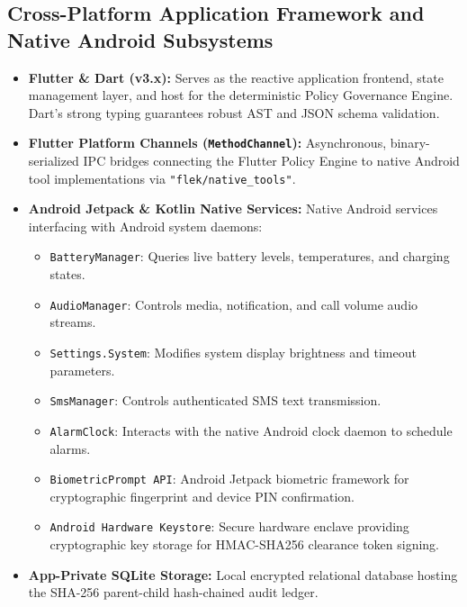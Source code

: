 \subsection{Cross-Platform Application Framework and Native Android Subsystems}
\begin{itemize}
    \item \textbf{Flutter \& Dart (v3.x):} Serves as the reactive application frontend, state management layer, and host for the deterministic Policy Governance Engine. Dart's strong typing guarantees robust AST and JSON schema validation.
    \item \textbf{Flutter Platform Channels (\texttt{MethodChannel}):} Asynchronous, binary-serialized IPC bridges connecting the Flutter Policy Engine to native Android tool implementations via \texttt{"flek/native\_tools"}.
    \item \textbf{Android Jetpack \& Kotlin Native Services:} Native Android services interfacing with Android system daemons:
    \begin{itemize}
        \item \texttt{BatteryManager}: Queries live battery levels, temperatures, and charging states.
        \item \texttt{AudioManager}: Controls media, notification, and call volume audio streams.
        \item \texttt{Settings.System}: Modifies system display brightness and timeout parameters.
        \item \texttt{SmsManager}: Controls authenticated SMS text transmission.
        \item \texttt{AlarmClock}: Interacts with the native Android clock daemon to schedule alarms.
        \item \texttt{BiometricPrompt API}: Android Jetpack biometric framework for cryptographic fingerprint and device PIN confirmation.
        \item \texttt{Android Hardware Keystore}: Secure hardware enclave providing cryptographic key storage for HMAC-SHA256 clearance token signing.
    \end{itemize}
    \item \textbf{App-Private SQLite Storage:} Local encrypted relational database hosting the SHA-256 parent-child hash-chained audit ledger.
\end{itemize}


